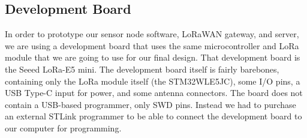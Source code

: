 \subsection{Development Board}
In order to prototype our sensor node software, LoRaWAN gateway, and server, we are using a development board that uses the same microcontroller and LoRa module that we are going to use for our final design. That development board is the Seeed LoRa-E5 mini. The development board itself is fairly barebones, containing only the LoRa module itself (the STM32WLE5JC), some I/O pins, a USB Type-C input for power, and some antenna connectors. The board does not contain a USB-based programmer, only SWD pins. Instead we had to purchase an external STLink programmer to be able to connect the development board to our computer for programming.